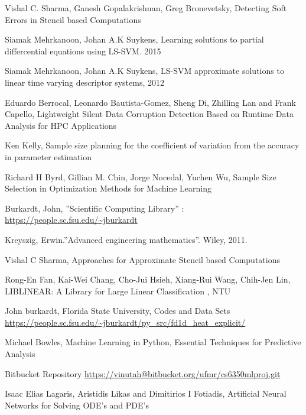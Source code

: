 \documentclass[letterpaper, 11 pt, conference]{ieeeconf}
\begin{document}
\begin{thebibliography}{99}

 Vishal C. Sharma, Ganesh Gopalakrishnan, Greg Bronevetsky, Detecting Soft Errors in Stencil based Computations

Siamak Mehrkanoon, Johan A.K Suykens, Learning solutions to partial differcential equations using LS-SVM. 2015

Siamak Mehrkanoon, Johan A.K Suykens, LS-SVM approximate solutions to linear time varying descriptor systems, 2012

Eduardo Berrocal, Leonardo Bautista-Gomez, Sheng Di, Zhilling Lan and Frank Capello, Lightweight Silent Data Corruption Detection Based on Runtime Data Analysis for HPC Applications

Ken Kelly, Sample size planning for the coefficient of variation from the accuracy in parameter estimation

Richard H Byrd, Gillian M. Chin, Jorge Nocedal, Yuchen Wu, Sample Size Selection in Optimization Methods for Machine Learning

Burkardt, John, ”Scientific Computing Library” : \url{https://people.sc.fsu.edu/~jburkardt}

Kreyszig, Erwin.”Advanced engineering mathematics”. Wiley, 2011.

Vishal C Sharma, Approaches for Approximate Stencil based Computations

Rong-En Fan, Kai-Wei Chang, Cho-Jui Hsieh, Xiang-Rui Wang, Chih-Jen Lin, LIBLINEAR: A Library for Large Linear Classification , NTU

John burkardt, Florida State University, Codes and Data Sets \url{https://people.sc.fsu.edu/~jburkardt/py_src/fd1d_heat_explicit/}

Michael Bowles, Machine Learning in Python, Essential Techniques for Predictive Analysis

Bitbucket Repository \url{https://vinutah@bitbucket.org/ufmr/cs6350mlproj.git}

Isaac Elias Lagaris, Aristidis Likas and Dimitirios I Fotiadis, Artificial Neural Networks for Solving ODE's and PDE's 

\end{thebibliography}
\end{document}
